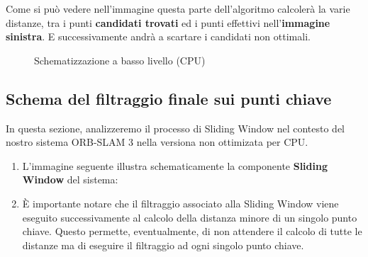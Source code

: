 \documentclass[12pt,a4paper]{report}
\begin{document}
Come si può vedere nell'immagine questa parte dell'algoritmo calcolerà la varie distanze, tra i punti \textbf{candidati trovati} ed i punti effettivi nell'\textbf{immagine sinistra}.
E successivamente andrà a scartare i candidati non ottimali.



\begin{figure}[H]
    \centering
    \caption{Schematizzazione a basso livello (CPU) }
\end{figure}

\subsection{Schema del filtraggio finale sui punti chiave} \label{filtraggio-finale}

In questa sezione, analizzeremo il processo di Sliding Window nel contesto del nostro sistema ORB-SLAM 3 nella versiona non ottimizata per CPU. 

\begin{enumerate}
    \item L'immagine seguente illustra schematicamente la componente \textbf{Sliding Window} del sistema:
    
    \item È importante notare che il filtraggio associato alla Sliding Window viene eseguito successivamente al calcolo della distanza minore di un singolo punto chiave. Questo permette, eventualmente, di non attendere il calcolo di tutte le distanze ma di eseguire il filtraggio ad ogni singolo punto chiave.
\end{enumerate}
\end{document}
